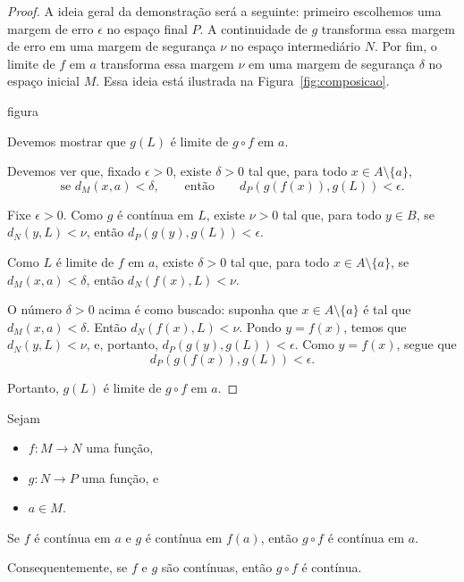 \begin{proof}
    A ideia geral da demonstração será a seguinte: primeiro escolhemos uma margem de erro $\epsilon$ no espaço final $P$.
    A continuidade de $g$ transforma essa margem de erro em uma margem de segurança $\nu$ no espaço intermediário $N$.
    Por fim, o limite de $f$ em $a$ transforma essa margem $\nu$ em uma margem de segurança $\delta$ no espaço inicial $M$.
    Essa ideia está ilustrada na Figura~\ref{fig:composicao}.

    {figura}

    Devemos mostrar que $g(L)$ é limite de $g\circ f$ em $a$.

    Devemos ver que, fixado $\epsilon>0$, existe $\delta>0$ tal que, para todo $x \in A\setminus\{a\}$, 
    \[
        \text{se } d_M(x, a) < \delta,\qquad \text{então} \qquad d_P(g(f(x)), g(L)) < \epsilon.
    \]

    Fixe $\epsilon>0$.
    Como $g$ é contínua em $L$, existe $\nu>0$ tal que, para todo $y \in B$, se $d_N(y, L) < \nu$, então $d_P(g(y), g(L)) < \epsilon$.

    Como $L$ é limite de $f$ em $a$, existe $\delta>0$ tal que, para todo $x \in A\setminus\{a\}$, se $d_M(x, a) < \delta$, então $d_N(f(x), L) < \nu$.
    
    O número $\delta>0$ acima é como buscado: suponha que $x \in A\setminus\{a\}$ é tal que $d_M(x, a) < \delta$.
    Então $d_N(f(x), L) < \nu$.
    Pondo $y = f(x)$, temos que $d_N(y, L) < \nu$, e, portanto, $d_P(g(y), g(L)) < \epsilon$.
    Como $y=f(x)$, segue que
    \[
        d_P(g(f(x)), g(L)) < \epsilon.
    \]

    Portanto, $g(L)$ é limite de $g\circ f$ em $a$.
\end{proof}

\begin{corollary}
    Sejam
    \begin{itemize}
        \item $f: M \to N$ uma função,
        \item $g: N \to P$ uma função, e
        \item $a \in M$.
    \end{itemize}

    Se $f$ é contínua em $a$ e $g$ é contínua em $f(a)$, então $g\circ f$ é contínua em $a$.

    Consequentemente, se $f$ e $g$ são contínuas, então $g\circ f$ é contínua.
\end{corollary}

